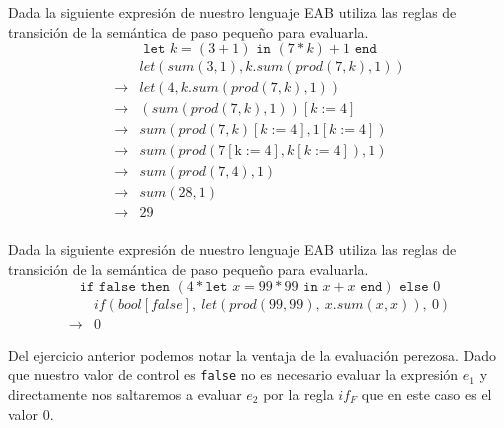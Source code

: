     \begin{exercise}
        Dada la siguiente expresión de nuestro lenguaje \textsf{EAB} utiliza las reglas de transición de la semántica de paso pequeño para evaluarla.
        \[
            \texttt{let } k = (3 + 1) \texttt{ in } (7 * k) + 1 \texttt{ end} 
        \]
        \[
            \begin{array}{cl}
                &\textit{let}(\textit{sum}(3,1), \textit{k}.\textit{sum}(\textit{prod}(7,\textit{k}), 1))\\
                \rightarrow &\textit{let}(4, \textit{k}.\textit{sum}(\textit{prod}(7, \textit{k}), 1))\\
                \rightarrow &(\textit{sum}(\textit{prod}(7, \textit{k}),1))[\textit{k}:=4]\\
                \rightarrow &\textit{sum}(\textit{prod}(7, \textit{k})[\textit{k}:=4],1[\textit{k}:=4])\\
                \rightarrow &\textit{sum}(\textit{prod}(7[\text{k}:=4], \textit{k}[\textit{k}:=4]),1)\\
                \rightarrow &\textit{sum}(\textit{prod}(7, 4), 1)\\
                \rightarrow &\textit{sum}(28, 1)\\
                \rightarrow &29\\
                

            \end{array}
        \]
        
    \end{exercise}


    \begin{exercise}
        Dada la siguiente expresión de nuestro lenguaje \textsf{EAB} utiliza las reglas de transición de la semántica de paso pequeño para evaluarla.
        \[
            \texttt{if }\texttt{false} \texttt{ then } (4 * \texttt{let } x = 99 * 99 \texttt{ in } x + x \texttt{ end}) \texttt{ else } 0 
        \] 
        \[
            \begin{array}{cl}
                &if(bool[false],\ let(prod(99,99),\ x.sum(x,x)),\ 0)\\
                \rightarrow &0

            \end{array}
        \]
    \end{exercise}

    Del ejercicio anterior podemos notar la ventaja de la evaluación perezosa. Dado que nuestro valor de control es \texttt{false} no es necesario evaluar la expresión $e_1$ y directamente nos saltaremos a evaluar $e_2$ por la regla $if_F$ que en este caso es el valor 0.\\
    
